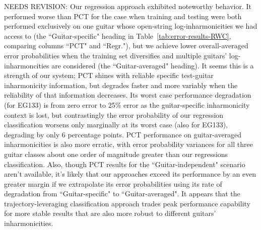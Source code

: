 \documentclass[12pt]{cmuthesis}
\begin{document}
NEEDS REVISION: Our regression approach exhibited noteworthy behavior. It performed worse than PCT for the case when training and testing were both performed exclusively on one guitar whose open-string log-inharmonicities we had access to (the ``Guitar-specific" heading in Table~\ref{tab:error-results-RWC}, comparing columns ``PCT" and ``Regr."), but we achieve lower overall-averaged error probabilities when the training set diversifies and multiple guitars' log-inharmoncities are considered (the ``Guitar-averaged" heading). It seems this is a strength of our system; PCT shines with reliable specific test-guitar inharmonicity information, but degrades faster and more variably when the reliability of that information decreases. Its worst case performance degradation (for EG133) is from zero error to 25\% error as the guitar-specific inharmonicity context is lost, but contrastingly the error probability of our regression classification worsens only marginally at its worst case (also for EG133), degrading by only 6 percentage points. PCT performance on guitar-averaged inharmonicities is also more erratic, with error probability variances for all three guitar classes about one order of magnitude greater than our regressions classification. Also, though PCT results for the ``Guitar-independent" scenario aren't available, it's likely that our approaches exceed its performance by an even greater margin if we extrapolate its error probabilities using its rate of degradation from ``Guitar-specific" to ``Guitar-averaged". It appears that the trajectory-leveraging classification approach trades peak performance capability for more stable results that are also more robust to different guitars' inharmonicities.


\end{document}
